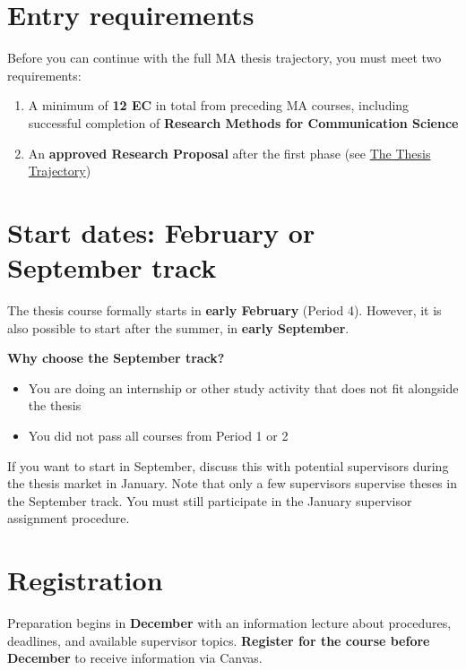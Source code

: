 \documentclass[
  11pt,
  a4paper,
]{scrbook}
\providecommand{\tightlist}{%
  \setlength{\itemsep}{0pt}\setlength{\parskip}{0pt}}\usepackage{longtable,booktabs,array}
\begin{document}
\section{Entry requirements}\label{entry-requirements}

Before you can continue with the full MA thesis trajectory, you must
meet two requirements:

\begin{enumerate}
\def\labelenumi{\arabic{enumi}.}
\tightlist
\item
  A minimum of \textbf{12 EC} in total from preceding MA courses,
  including successful completion of \textbf{Research Methods for
  Communication Science}
\item
  An \textbf{approved Research Proposal} after the first phase (see
  \href{trajectory.qmd}{The Thesis Trajectory})
\end{enumerate}

\section{Start dates: February or September
track}\label{start-dates-february-or-september-track}

The thesis course formally starts in \textbf{early February} (Period 4).
However, it is also possible to start after the summer, in \textbf{early
September}.

\textbf{Why choose the September track?}

\begin{itemize}
\tightlist
\item
  You are doing an internship or other study activity that does not fit
  alongside the thesis
\item
  You did not pass all courses from Period 1 or 2
\end{itemize}

If you want to start in September, discuss this with potential
supervisors during the thesis market in January. Note that only a few
supervisors supervise theses in the September track. You must still
participate in the January supervisor assignment procedure.

\section{Registration}\label{registration}

Preparation begins in \textbf{December} with an information lecture
about procedures, deadlines, and available supervisor topics.
\textbf{Register for the course before December} to receive information
via Canvas.
\end{document}
